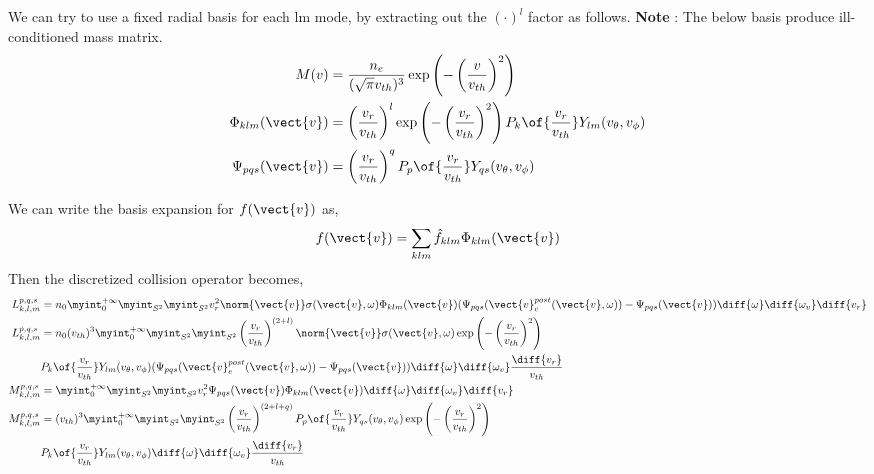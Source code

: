 We can try to use a fixed radial basis for each lm mode, by extracting out the $(\cdot)^{l}$ factor as follows. 
\textbf{Note} : The below basis produce ill-conditioned mass matrix. 
\begin{align*}
M(v) & = \frac{n_e}{(\sqrt{\pi}v_{th})^3} \exp{\left(-\left(\frac{v}{v_{th}}\right)^2 \right)} \\
\Phi_{klm} (\vect{v}) &= \left(\frac{v_r}{v_{th}}\right)^l \exp\left(-\left(\frac{v_r}{v_{th}}\right) ^ 2\right)  P_k\of{\frac{v_r}{v_{th}}} Y_{lm}(v_\theta,v_\phi) \\
\Psi_{pqs} (\vect{v}) &= \left(\frac{v_r}{v_{th}}\right)^q P_p\of{\frac{v_r}{v_{th}}} Y_{qs}(v_\theta,v_\phi)
\end{align*}

We can write the basis expansion for $f(\vect{v})$ as,  
\begin{align*}
f(\vect{v})  = \sum_{klm} \hat{f}_{klm} \Phi_{klm} (\vect{v})
\end{align*}
Then the discretized collision operator becomes, 
\begin{align*}
{L}_{k,l,m}^{p,q,s} &=n_0 \myint_{0}^{+\infty} \myint_{S^2} \myint_{S^2} v_r^2 \norm{\vect{v}} \sigma(\vect{v},\omega) \Phi_{klm}(\vect{v})   (\Psi_{pqs}(\vect{v}_e^{post}(\vect{v},\omega)) - \Psi_{pqs}(\vect{v})) \diff{\omega} \diff{\omega_v} \diff{v_r} \\
{L}_{k,l,m}^{p,q,s} &=n_0 (v_{th})^3 \myint_{0}^{+\infty} \myint_{S^2} \myint_{S^2} \left(\frac{v_r}{v_{th}}\right)^{(2+l)} \norm{\vect{v}} \sigma(\vect{v},\omega) \exp\left(-\left(\frac{v_r}{v_{th}}\right) ^ 2\right) \\
&P_k\of{\frac{v_r}{v_{th}}} Y_{lm}(v_\theta,v_\phi)  (\Psi_{pqs}(\vect{v}_e^{post}(\vect{v},\omega)) - \Psi_{pqs}(\vect{v})) \diff{\omega} \diff{\omega_v} \frac{\diff{v_r}}{v_{th}} \\
{M}_{k,l,m}^{p,q,s} &= \myint_{0}^{+\infty} \myint_{S^2} \myint_{S^2}  v_r^2 \Psi_{pqs}(\vect{v}) \Phi_{klm}(\vect{v}) \diff{\omega} \diff{\omega_v} \diff{v_r}\\
{M}_{k,l,m}^{p,q,s} &= (v_{th})^3 \myint_{0}^{+\infty} \myint_{S^2} \myint_{S^2} 
\left(\frac{v_r}{v_{th}}\right)^{(2+l+q)} P_p\of{\frac{v_r}{v_{th}}} Y_{qs}(v_\theta,v_\phi) \exp\left(-\left(\frac{v_r}{v_{th}}\right) ^ 2\right)  \\& P_k\of{\frac{v_r}{v_{th}}} Y_{lm}(v_\theta,v_\phi) \diff{\omega} \diff{\omega_v} \frac{\diff{v_r}}{v_{th}}
\end{align*}

